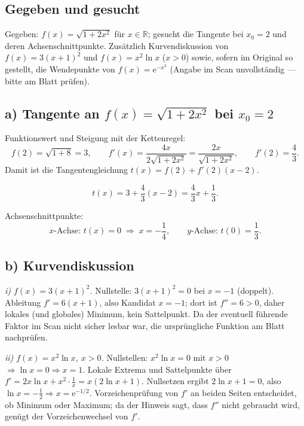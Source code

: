
\subsection*{Gegeben und gesucht}
Gegeben: $f(x)=\sqrt{1+2x^2}$ für $x\in\mathbb R$; gesucht die Tangente bei
$x_0=2$ und deren Achsenschnittpunkte. Zusätzlich Kurvendiskussion von
$f(x)=3(x+1)^2$ und $f(x)=x^2\ln x$ ($x>0$) sowie, sofern im Original so
gestellt, die Wendepunkte von $f(x)=\mathrm e^{-x^2}$ (Angabe im Scan
unvollständig — bitte am Blatt prüfen).

\subsection*{a) Tangente an $f(x)=\sqrt{1+2x^2}$ bei $x_0=2$}
Funktionswert und Steigung mit der Kettenregel:
\begin{equation}
  f(2)=\sqrt{1+8}=3,
  \qquad
  f'(x)=\frac{4x}{2\sqrt{1+2x^2}}=\frac{2x}{\sqrt{1+2x^2}},
  \qquad
  f'(2)=\frac{4}{3}.
\end{equation}
Damit ist die Tangentengleichung $t(x)=f(2)+f'(2)(x-2)$.

\begin{ergebnis}
\begin{equation*}
  t(x)=3+\frac43(x-2)=\frac43 x+\frac13.
\end{equation*}
\end{ergebnis}
Achsenschnittpunkte:
\begin{equation}
  x\text{-Achse: }t(x)=0 \;\Rightarrow\; x=-\frac14,\qquad
  y\text{-Achse: }t(0)=\frac13.
\end{equation}

\subsection*{b) Kurvendiskussion}
\emph{i) $f(x)=3(x+1)^2$.} Nullstelle: $3(x+1)^2=0$ bei $x=-1$ (doppelt). Ableitung
$f'=6(x+1)$, also Kandidat $x=-1$; dort ist $f''=6>0$, daher lokales (und
globales) Minimum, kein Sattelpunkt. Da der eventuell führende Faktor im Scan
nicht sicher lesbar war, die ursprüngliche Funktion am Blatt nachprüfen.

\emph{ii) $f(x)=x^2\ln x$, $x>0$.} Nullstellen: $x^2\ln x=0$ mit $x>0$
$\Rightarrow\ln x=0 \Rightarrow x=1$. Lokale Extrema und Sattelpunkte über
$f'=2x\ln x + x^2\cdot\frac1x = x(2\ln x+1)$. Nullsetzen ergibt $2\ln x+1=0$,
also $\ln x=-\frac12 \Rightarrow x=\mathrm e^{-1/2}$. Vorzeichenprüfung von
$f'$ an beiden Seiten entscheidet, ob Minimum oder Maximum; da der Hinweis sagt,
dass $f''$ nicht gebraucht wird, genügt der Vorzeichenwechsel von $f'$.

